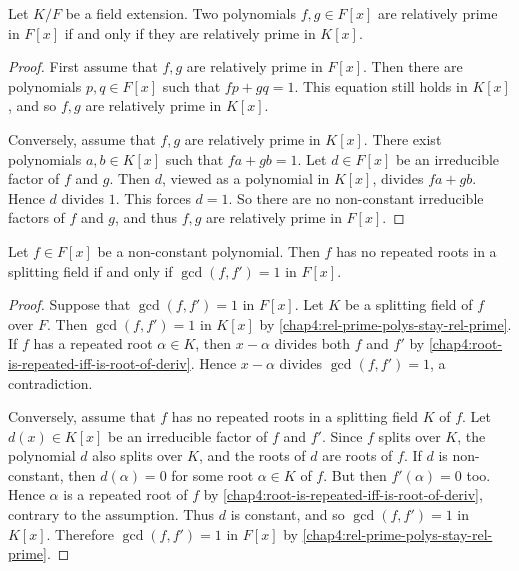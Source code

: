 \begin{lemma}\label{chap4:rel-prime-polys-stay-rel-prime}
	Let $K/F$ be a field extension. Two polynomials $f, g \in F[x]$ are relatively prime in $F[x]$ if and only if they are relatively prime in $K[x]$.
\end{lemma}
\begin{proof}
	First assume that $f, g$ are relatively prime in $F[x]$. Then there are polynomials $p, q \in F[x]$ such that $fp + gq = 1$. This equation still holds in $K[x]$, and so $f, g$ are relatively prime in $K[x]$.
	
	Conversely, assume that $f, g$ are relatively prime in $K[x]$. There exist polynomials $a, b \in K[x]$ such that $fa + gb = 1$. Let $d \in F[x]$ be an irreducible factor of $f$ and $g$. Then $d$, viewed as a polynomial in $K[x]$, divides $fa + gb$. Hence $d$ divides $1$. This forces $d = 1$. So there are no non-constant irreducible factors of $f$ and $g$, and thus $f, g$ are relatively prime in $F[x]$.
\end{proof}

\begin{proposition}\label{chap4:no-rep-roots-if-gcd-is-one}
	Let $f \in F[x]$ be a non-constant polynomial. Then $f$ has no repeated roots in a splitting field if and only if $\gcd(f, f') = 1$ in $F[x]$.
\end{proposition}
\begin{proof}
	Suppose that $\gcd(f, f') = 1$ in $F[x]$. Let $K$ be a splitting field of $f$ over $F$. Then $\gcd(f, f') = 1$ in $K[x]$ by \cref{chap4:rel-prime-polys-stay-rel-prime}. If $f$ has a repeated root $\alpha \in K$, then $x - \alpha$ divides both $f$ and $f'$ by \cref{chap4:root-is-repeated-iff-is-root-of-deriv}. Hence $x - \alpha$ divides $\gcd(f, f') = 1$, a contradiction.
	
	Conversely, assume that $f$ has no repeated roots in a splitting field $K$ of $f$. Let $d(x) \in K[x]$ be an irreducible factor of $f$ and $f'$. Since $f$ splits over $K$, the polynomial $d$ also splits over $K$, and the roots of $d$ are roots of $f$. If $d$ is non-constant, then $d(\alpha) = 0$ for some root $\alpha \in K$ of $f$. But then $f'(\alpha) = 0$ too. Hence $\alpha$ is a repeated root of $f$ by \cref{chap4:root-is-repeated-iff-is-root-of-deriv}, contrary to the assumption. Thus $d$ is constant, and so $\gcd(f, f') = 1$ in $K[x]$. Therefore $\gcd(f, f') = 1$ in $F[x]$ by \cref{chap4:rel-prime-polys-stay-rel-prime}.
\end{proof}

